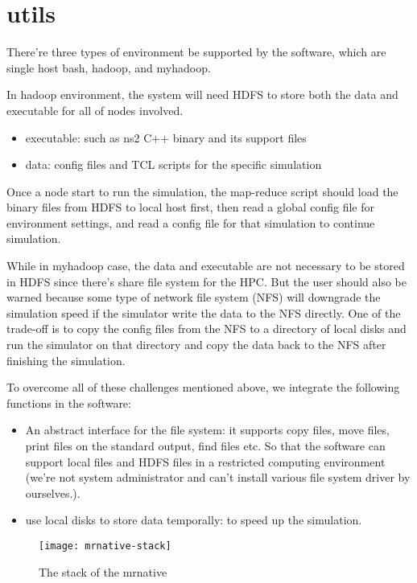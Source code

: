 \section{utils}

There're three types of environment be supported by the software,
which are single host bash, hadoop, and myhadoop.

In hadoop environment, the system will need HDFS to store both the data and executable for all of nodes involved.
\begin{itemize}
  \item executable: such as ns2 C++ binary and its support files
  \item data: config files and TCL scripts for the specific simulation
\end{itemize}
Once a node start to run the simulation, the map-reduce script should load the binary files from HDFS to local host first,
then read a global config file for environment settings,
and read a config file for that simulation to continue simulation.

While in myhadoop case, the data and executable are not necessary to be stored in HDFS since there's share file system for the HPC.
But the user should also be warned because some type of network file system (NFS) will downgrade the simulation speed if the simulator write the data to the NFS directly.
One of the trade-off is to copy the config files from the NFS to a directory of local disks and run the simulator on that directory and copy the data back to the NFS after finishing the simulation.

To overcome all of these challenges mentioned above,
we integrate the following functions in the software:
\begin{itemize}
  \item An abstract interface for the file system: it supports copy files, move files, print files on the standard output, find files etc. So that the software can support local files and HDFS files in a restricted computing environment (we're not system administrator and can't install various file system driver by ourselves.).
  \item use local disks to store data temporally: to speed up the simulation.
\end{itemize}

\begin{figure}\centering
  \texttt{[image: mrnative-stack]}
  \caption{The stack of the mrnative}\label{fig:mrnativestack}
\end{figure}

